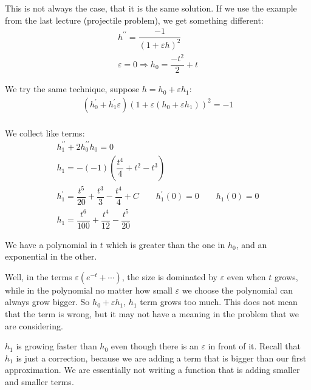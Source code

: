 \noindent This is not always the case, that it is the same solution. If we use the example from the last lecture (projectile problem), we get something different:
\begin{equation*}
  \begin{gathered}
    h^{\prime\prime} = \dfrac{-1}{(1+\varepsilon h)^2}\\
    \varepsilon = 0\Rightarrow h_0 = \dfrac{-t^2}{2}+t
  \end{gathered}
\end{equation*}\par
\noindent We try the same technique, suppose $h = h_0+\varepsilon h_1$:
\begin{equation*}
  \begin{gathered}
    (h^{\prime}_0+h^{\prime}_1\varepsilon)(1+\varepsilon(h_0+\varepsilon h_1))^2 = -1\\
  \end{gathered}
\end{equation*}\par
\noindent We collect like terms:
\begin{equation*}
  \begin{gathered}
    h_1^{\prime\prime}+2h^{\prime\prime}_0h_0=0\\
    h_1 = -(-1)\left(\dfrac{t^4}{4}+t^2-t^3\right)\\
    h^{\prime}_1 = \dfrac{t^5}{20}+\dfrac{t^3}{3}-\dfrac{t^4}{4}+C\qquad h^{\prime}_1(0) = 0\qquad h_1(0) = 0\\
    h_1 = \dfrac{t^6}{100}+\dfrac{t^4}{12}-\dfrac{t^5}{20}
  \end{gathered}
\end{equation*}\par
\noindent We have a polynomial in $t$ which is greater than the one in $h_0$, and an exponential in the other.
\par\bigskip
\noindent Well, in the terms $\varepsilon(e^{-t}+\cdots)$, the size is dominated by $\varepsilon$ even when $t$ grows, while in the polynomial no matter how small $\varepsilon$ we choose the polynomial can always grow bigger. So $h_0+\varepsilon h_1$, $h_1$ term grows too much. This does not mean that the term is wrong, but it may not have a meaning in the problem that we are considering. 
\par\bigskip
\noindent $h_1$ is growing faster than $h_0$ even though there is an $\varepsilon$ in front of it. Recall that $h_1$ is just a correction, because we are adding a term that is bigger than our first approximation. We are essentially not writing a function that is adding smaller and smaller terms. 
